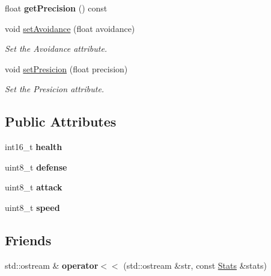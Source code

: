 \begin{DoxyCompactItemize}
\item 
\mbox{\label{structmonsterbattle_1_1monster_1_1Stats_abf712b03ec3c58827c15407e80c0c5b5}} 
float {\bfseries get\+Precision} () const
\item 
void \hyperlink{structmonsterbattle_1_1monster_1_1Stats_a7e75ea5eca5546e4b50ffe3c7a93b104}{set\+Avoidance} (float avoidance)
\begin{DoxyCompactList}\small\item\em Set the Avoidance attribute. \end{DoxyCompactList}\item 
void \hyperlink{structmonsterbattle_1_1monster_1_1Stats_aaffb26069cf1f14c7a2b0dd0fbd5a44c}{set\+Presicion} (float precision)
\begin{DoxyCompactList}\small\item\em Set the Presicion attribute. \end{DoxyCompactList}\end{DoxyCompactItemize}
\subsection*{Public Attributes}
\begin{DoxyCompactItemize}
\item 
\mbox{\label{structmonsterbattle_1_1monster_1_1Stats_afd3e8e17b4e35b0362522846c978dbe7}} 
int16\+\_\+t {\bfseries health}
\item 
\mbox{\label{structmonsterbattle_1_1monster_1_1Stats_ac252a321af0dc175cc4ea5b20adb16f0}} 
uint8\+\_\+t {\bfseries defense}
\item 
\mbox{\label{structmonsterbattle_1_1monster_1_1Stats_a678541cb5afdabdd5e6c75fb0ce76fb7}} 
uint8\+\_\+t {\bfseries attack}
\item 
\mbox{\label{structmonsterbattle_1_1monster_1_1Stats_a4ee407a99608f9e3856515502f01bed0}} 
uint8\+\_\+t {\bfseries speed}
\end{DoxyCompactItemize}
\subsection*{Friends}
\begin{DoxyCompactItemize}
\item 
\mbox{\label{structmonsterbattle_1_1monster_1_1Stats_a0b050a0156d2451804baa1455ea7c68d}} 
std\+::ostream \& {\bfseries operator$<$$<$} (std\+::ostream \&str, const \hyperlink{structmonsterbattle_1_1monster_1_1Stats}{Stats} \&stats)
\end{DoxyCompactItemize}


